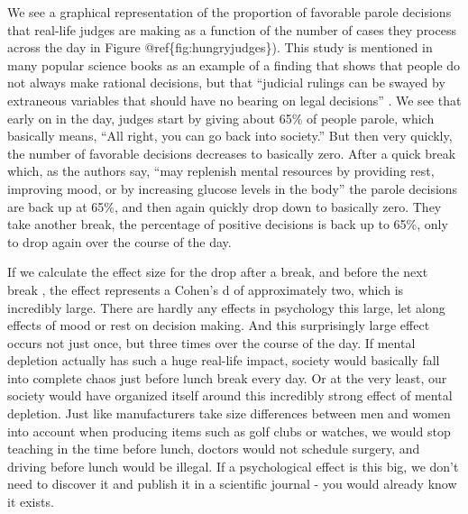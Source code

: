 \documentclass[
]{krantz}
\begin{document}
We see a graphical representation of the proportion of favorable parole decisions that real-life judges are making as a function of the number of cases they process across the day in Figure @ref\{fig:hungryjudges\}). This study is mentioned in many popular science books as an example of a finding that shows that people do not always make rational decisions, but that ``judicial rulings can be swayed by extraneous variables that should have no bearing on legal decisions'' \citep{danziger_extraneous_2011}. We see that early on in the day, judges start by giving about 65\% of people parole, which basically means, ``All right, you can go back into society.'' But then very quickly, the number of favorable decisions decreases to basically zero. After a quick break which, as the authors say, ``may replenish mental resources by providing rest, improving mood, or by increasing glucose levels in the body'' the parole decisions are back up at 65\%, and then again quickly drop down to basically zero. They take another break, the percentage of positive decisions is back up to 65\%, only to drop again over the course of the day.

If we calculate the effect size for the drop after a break, and before the next break \citep{glockner_irrational_2016}, the effect represents a Cohen's d of approximately two, which is incredibly large. There are hardly any effects in psychology this large, let along effects of mood or rest on decision making. And this surprisingly large effect occurs not just once, but three times over the course of the day. If mental depletion actually has such a huge real-life impact, society would basically fall into complete chaos just before lunch break every day. Or at the very least, our society would have organized itself around this incredibly strong effect of mental depletion. Just like manufacturers take size differences between men and women into account when producing items such as golf clubs or watches, we would stop teaching in the time before lunch, doctors would not schedule surgery, and driving before lunch would be illegal. If a psychological effect is this big, we don't need to discover it and publish it in a scientific journal - you would already know it exists.
\end{document}
